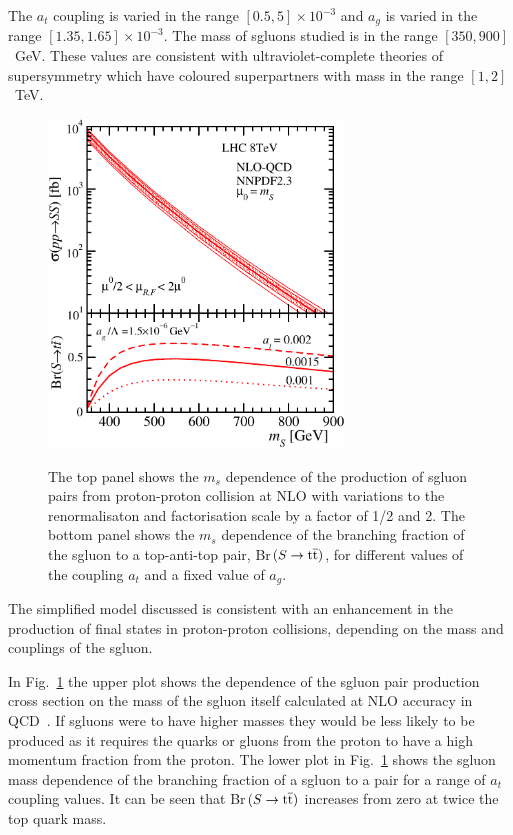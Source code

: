 The $a_t$ coupling is varied in the range $[0.5,5]\times 10^{-3}$ and $a_g$ is varied in the range $[1.35, 1.65] \times 10^{-3}$. The mass of sgluons studied is in the range $[350,900]$~GeV. These values are consistent with ultraviolet-complete theories of supersymmetry which have coloured superpartners with mass in the range $[1,2]$~TeV.
\begin{figure}[h!]
\centering
    \includegraphics[width=0.7\textwidth]{images/Pheno/xsec.pdf}\\
    \caption{The top panel shows the $m_s$ dependence of the production of sgluon pairs from proton-proton collision at NLO with variations to the renormalisaton and factorisation scale by a factor of 1/2 and 2. The bottom panel shows the $m_s$ dependence of the branching fraction of the sgluon to a top-anti-top pair, Br$(S\rightarrow\mathrm{t}\overline{\mathrm{t}})$, for different values of the coupling $a_t$ and a fixed value of $a_g$.}
    \label{fig:sgluonxsec}
\end{figure}

The simplified model discussed is consistent with an enhancement in the production of \tttt final states in proton-proton collisions, depending on the mass and couplings of the sgluon.

In Fig.~\ref{fig:sgluonxsec} the upper plot shows the dependence of the sgluon pair production cross section on the mass of the sgluon itself calculated at NLO accuracy in QCD~\cite{GoncalvesNetto:2012nt,Degrande:2014sta}. If sgluons were to have higher masses they would be less likely to be produced as it requires the quarks or gluons from the proton to have a high momentum fraction from the proton. The lower plot in Fig.~\ref{fig:sgluonxsec} shows the sgluon mass dependence of the branching fraction of a sgluon to a \ttbar pair for a range of $a_t$ coupling values. It can be seen that Br$(S\rightarrow\mathrm{t}\overline{\mathrm{t}})$ increases from zero at twice the top quark mass.


